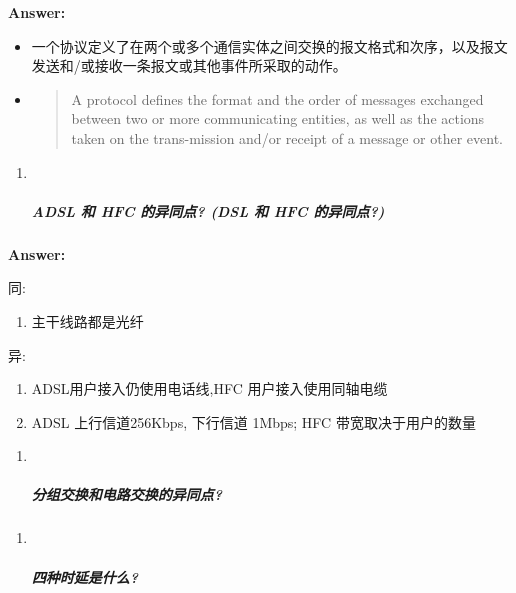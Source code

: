 \documentclass[
]{article}
\begin{document}
\textbf{Answer:}

\begin{itemize}
\item
  一个协议定义了在两个或多个通信实体之间交换的报文格式和次序，以及报文发送和/或接收一条报文或其他事件所采取的动作。
\item
  \begin{quote}
  A protocol defines the format and the order of messages exchanged
  between two or more communicating entities, as well as the actions
  taken on the trans-mission and/or receipt of a message or other event.
  \end{quote}
\end{itemize}

\begin{enumerate}
\def\labelenumi{\arabic{enumi}.}
\item ~
  \hypertarget{adsl-ux548c-hfc-ux7684ux5f02ux540cux70b9-dsl-ux548c-hfc-ux7684ux5f02ux540cux70b9}{%
  \subparagraph{ADSL 和 HFC 的异同点? (DSL 和 HFC
  的异同点?)}\label{adsl-ux548c-hfc-ux7684ux5f02ux540cux70b9-dsl-ux548c-hfc-ux7684ux5f02ux540cux70b9}}
\end{enumerate}

\textbf{Answer:}

同:

\begin{enumerate}
\def\labelenumi{\arabic{enumi}.}
\item
  主干线路都是光纤
\end{enumerate}

异:

\begin{enumerate}
\def\labelenumi{\arabic{enumi}.}
\item
  ADSL用户接入仍使用电话线,HFC 用户接入使用同轴电缆
\item
  ADSL 上行信道256Kbps, 下行信道 1Mbps; HFC 带宽取决于用户的数量
\end{enumerate}

\begin{enumerate}
\def\labelenumi{\arabic{enumi}.}
\item ~
  \hypertarget{ux5206ux7ec4ux4ea4ux6362ux548cux7535ux8defux4ea4ux6362ux7684ux5f02ux540cux70b9}{%
  \subparagraph{分组交换和电路交换的异同点?}\label{ux5206ux7ec4ux4ea4ux6362ux548cux7535ux8defux4ea4ux6362ux7684ux5f02ux540cux70b9}}
\end{enumerate}

\begin{enumerate}
\def\labelenumi{\arabic{enumi}.}
\item ~
  \hypertarget{ux56dbux79cdux65f6ux5ef6ux662fux4ec0ux4e48}{%
  \subparagraph{四种时延是什么?}\label{ux56dbux79cdux65f6ux5ef6ux662fux4ec0ux4e48}}
\end{enumerate}
\end{document}

